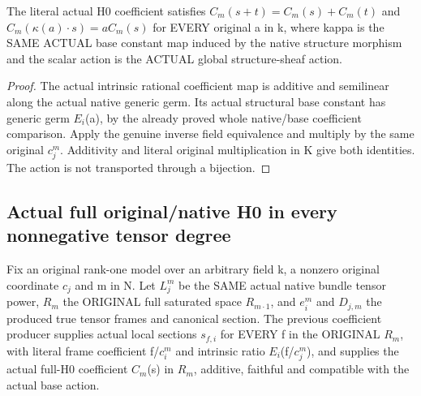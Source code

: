 \begin{lemma}
\label{lem:seven-native-original-tensor-coefficient-actual-scalars}
\leanok
The literal actual H0 coefficient satisfies
$C_m(s+t)=C_m(s)+C_m(t)$ and
$C_m(\kappa(a)\cdot s)=a C_m(s)$ for EVERY original a in k, where kappa
is the SAME ACTUAL base constant map induced by the native structure
morphism and the scalar action is the ACTUAL global structure-sheaf action.
\end{lemma}
\begin{proof}
The actual intrinsic rational coefficient map is additive and semilinear
along the actual native generic germ. Its actual structural base constant
has generic germ $E_i$(a), by the already proved whole native/base coefficient
comparison. Apply the genuine inverse field equivalence and multiply by
the same original $c_j^m$. Additivity and literal original multiplication in
K give both identities. The action is not transported through a bijection.
\end{proof}


\subsection{Actual full original/native H0 in every nonnegative tensor degree}
Fix an original rank-one model over an arbitrary field k, a nonzero
original coordinate $c_j$ and m in N. Let $L_j^m$ be the SAME actual native
bundle tensor power, $R_m$ the ORIGINAL full saturated space $R_{m\cdot1}$,
and $e_i^m$ and $D_{j,m}$ the produced true tensor frames and canonical section.
The previous coefficient producer supplies actual local sections $s_{f,i}$
for EVERY f in the ORIGINAL $R_m$, with literal frame coefficient f/$c_i^m$
and intrinsic ratio $E_i$(f/$c_j^m$), and supplies the actual full-H0 coefficient
$C_m$(s) in $R_m$, additive, faithful and compatible with the actual base action.


